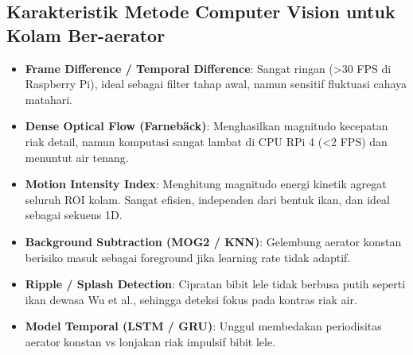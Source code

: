 \documentclass[10pt,a4paper]{article}
\begin{document}
\subsection{Karakteristik Metode Computer Vision untuk Kolam Ber-aerator}
{\small
\begin{itemize}[leftmargin=*,itemsep=0pt,topsep=1pt,parsep=0pt]
    \item \textbf{Frame Difference / Temporal Difference}: Sangat ringan (>30 FPS di Raspberry Pi), ideal sebagai filter tahap awal, namun sensitif fluktuasi cahaya matahari.
    \item \textbf{Dense Optical Flow (Farnebäck)}: Menghasilkan magnitudo kecepatan riak detail, namun komputasi sangat lambat di CPU RPi 4 (<2 FPS) dan menuntut air tenang.
    \item \textbf{Motion Intensity Index}: Menghitung magnitudo energi kinetik agregat seluruh ROI kolam. Sangat efisien, independen dari bentuk ikan, dan ideal sebagai sekuens 1D.
    \item \textbf{Background Subtraction (MOG2 / KNN)}: Gelembung aerator konstan berisiko masuk sebagai foreground jika learning rate tidak adaptif.
    \item \textbf{Ripple / Splash Detection}: Cipratan bibit lele tidak berbusa putih seperti ikan dewasa Wu et al., sehingga deteksi fokus pada kontras riak air.
    \item \textbf{Model Temporal (LSTM / GRU)}: Unggul membedakan periodisitas aerator konstan vs lonjakan riak impulsif bibit lele.
\end{itemize}
}
\end{document}
